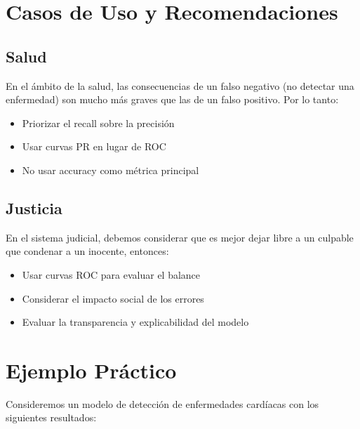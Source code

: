 \documentclass[12pt]{article}
\begin{document}
\section{Casos de Uso y Recomendaciones}

\subsection{Salud}
En el ámbito de la salud, las consecuencias de un falso negativo (no detectar una enfermedad) son mucho más graves que las de un falso positivo. Por lo tanto:
\begin{itemize}
    \item Priorizar el recall sobre la precisión
    \item Usar curvas PR en lugar de ROC
    \item No usar accuracy como métrica principal
\end{itemize}

\subsection{Justicia}
En el sistema judicial, debemos considerar que es mejor dejar libre a un culpable que condenar a un inocente, entonces:
\begin{itemize}
    \item Usar curvas ROC para evaluar el balance
    \item Considerar el impacto social de los errores
    \item Evaluar la transparencia y explicabilidad del modelo
\end{itemize}

\section{Ejemplo Práctico}
Consideremos un modelo de detección de enfermedades cardíacas con los siguientes resultados:

\begin{center}
\end{center}
\end{document}
